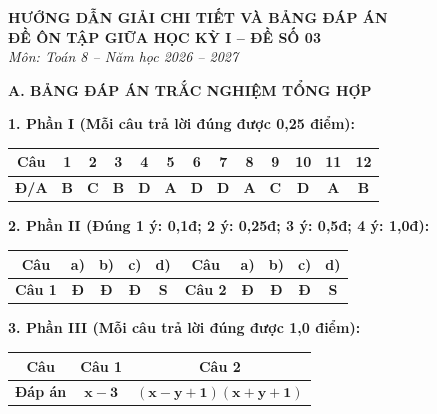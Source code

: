 \documentclass[12pt,a4paper]{article}
\begin{document}
\begin{center}
  \textbf{\Large HƯỚNG DẪN GIẢI CHI TIẾT VÀ BẢNG ĐÁP ÁN}\\
  \textbf{\large ĐỀ ÔN TẬP GIỮA HỌC KỲ I -- ĐỀ SỐ 03}\\
  \textit{Môn: Toán 8 -- Năm học 2026 -- 2027}
\end{center}
\vspace{2mm}

\noindent\textbf{\large A. BẢNG ĐÁP ÁN TRẮC NGHIỆM TỔNG HỢP}
\vspace{1mm}

\noindent\textbf{1. Phần I (Mỗi câu trả lời đúng được 0,25 điểm):}
\begin{center}
\begin{tabular}{|c|c|c|c|c|c|c|c|c|c|c|c|c|}
\hline
\textbf{Câu} & \textbf{1} & \textbf{2} & \textbf{3} & \textbf{4} & \textbf{5} & \textbf{6} & \textbf{7} & \textbf{8} & \textbf{9} & \textbf{10} & \textbf{11} & \textbf{12} \\
\hline
\textbf{Đ/A} & \textbf{B} & \textbf{C} & \textbf{B} & \textbf{D} & \textbf{A} & \textbf{D} & \textbf{D} & \textbf{A} & \textbf{C} & \textbf{D} & \textbf{A} & \textbf{B} \\
\hline
\end{tabular}
\end{center}
\vspace{0.5mm}

\noindent\textbf{2. Phần II (Đúng 1 ý: 0,1đ; 2 ý: 0,25đ; 3 ý: 0,5đ; 4 ý: 1,0đ):}
\begin{center}
\begin{tabular}{|c|c|c|c|c||c|c|c|c|c|}
\hline
\textbf{Câu} & \textbf{a)} & \textbf{b)} & \textbf{c)} & \textbf{d)} & \textbf{Câu} & \textbf{a)} & \textbf{b)} & \textbf{c)} & \textbf{d)} \\
\hline
\textbf{Câu 1} & \textbf{Đ} & \textbf{Đ} & \textbf{Đ} & \textbf{S} & \textbf{Câu 2} & \textbf{Đ} & \textbf{Đ} & \textbf{Đ} & \textbf{S} \\
\hline
\end{tabular}
\end{center}
\vspace{0.5mm}

\noindent\textbf{3. Phần III (Mỗi câu trả lời đúng được 1,0 điểm):}
\begin{center}
\begin{tabular}{|c|c|c|}
\hline
\textbf{Câu} & \textbf{Câu 1} & \textbf{Câu 2} \\
\hline
\textbf{Đáp án} & $\mathbf{x - 3}$ & $\mathbf{(x - y + 1)(x + y + 1)}$ \\
\hline
\end{tabular}
\end{center}
\vspace{1.5mm}
\end{document}
